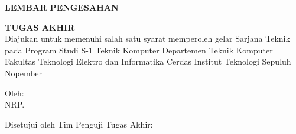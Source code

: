 \begin{center}
  \large
  \textbf{LEMBAR PENGESAHAN}
\end{center}

\thispagestyle{empty}

\begin{center}
  \textbf{\tatitle{}}
\end{center}

\begingroup
\small


\begin{center}
  \textbf{TUGAS AKHIR}
  \\Diajukan untuk memenuhi salah satu syarat memperoleh gelar Sarjana Teknik pada Program Studi S-1 Teknik Komputer Departemen Teknik Komputer Fakultas Teknologi Elektro dan Informatika Cerdas Institut Teknologi Sepuluh Nopember
\end{center}


\begin{center}
  Oleh: \name{}
  \\NRP. \nrp{}
\end{center}



\begin{center}
  Disetujui oleh Tim Penguji Tugas Akhir:
\end{center}


\begingroup
\setlength{\tabcolsep}{0pt}

